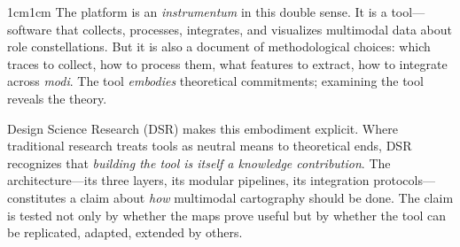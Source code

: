 \documentclass[../main.tex]{subfiles}
\begin{document}
\begin{adjustwidth}{1cm}{1cm}
The \textbf{\RoleBox} platform is an \textit{instrumentum} in this double sense. It is a tool---software that collects, processes, integrates, and visualizes multimodal data about role constellations. But it is also a document of methodological choices: which traces to collect, how to process them, what features to extract, how to integrate across \textit{modi}. The tool \textit{embodies} theoretical commitments; examining the tool reveals the theory.

Design Science Research (DSR) makes this embodiment explicit. Where traditional research treats tools as neutral means to theoretical ends, DSR recognizes that \textit{building the tool is itself a knowledge contribution}. The \RoleBox architecture---its three layers, its modular pipelines, its integration protocols---constitutes a claim about \textit{how} multimodal cartography should be done. The claim is tested not only by whether the maps prove useful but by whether the tool can be replicated, adapted, extended by others.

\vspace{0.5cm}

\begin{center}
\end{center}
\end{adjustwidth}
\end{document}
